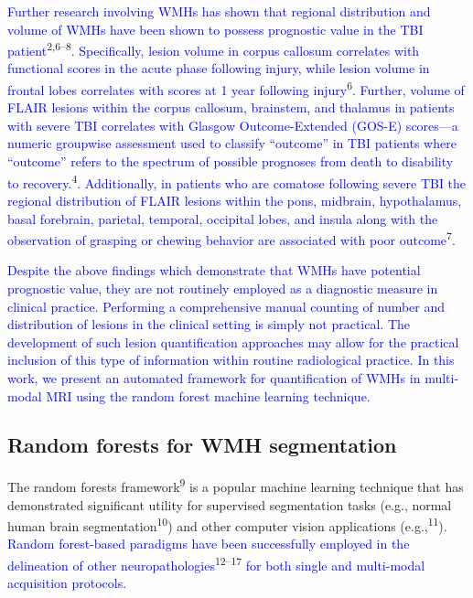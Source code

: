 \documentclass[11pt,]{article}
\begin{document}
\textcolor{blue}{Further research involving WMHs has shown that regional distribution and volume of WMHs have been shown to possess prognostic value in the TBI patient}\textsuperscript{2,6--8}\textcolor{blue}{. Specifically, lesion volume in corpus callosum correlates with functional scores in the acute phase following injury, while lesion volume in frontal lobes correlates with scores at 1 year following injury}\textsuperscript{6}\textcolor{blue}{.
Further, volume of FLAIR lesions within the corpus
callosum, brainstem, and thalamus in patients with severe TBI correlates
with Glasgow Outcome-Extended (GOS-E) scores---a numeric groupwise assessment used to
classify ``outcome'' in TBI patients where ``outcome'' refers to the
spectrum of possible prognoses from death to disability to recovery.}\textsuperscript{4}\textcolor{blue}{. Additionally,
in patients who are comatose following severe TBI
the regional distribution of FLAIR lesions within the pons, midbrain, hypothalamus, basal forebrain, parietal, temporal, occipital lobes, and insula along with the observation of grasping or chewing behavior are associated with poor outcome}\textsuperscript{7}.

\textcolor{blue}{Despite the above findings which demonstrate that WMHs have potential prognostic value, they are not routinely employed as a diagnostic measure in clinical practice.  Performing a comprehensive manual counting of number and distribution of lesions in the clinical setting is simply not practical. The development of such lesion quantification approaches may allow for the practical inclusion of this type of information within routine radiological practice.  In this work, we present an automated framework for quantification of WMHs in
multi-modal MRI using the random forest machine learning technique.}

\subsection{Random forests for WMH
segmentation}\label{random-forests-for-wmh-segmentation}

The random forests framework\textsuperscript{9} is a popular machine
learning technique that has demonstrated significant utility for
supervised segmentation tasks (e.g., normal human brain
segmentation\textsuperscript{10}) and other computer vision applications
(e.g.,\textsuperscript{11}).
\textcolor{blue}{Random forest-based paradigms have been successfully employed in the
delineation of other neuropathologies}\textsuperscript{12--17}
\textcolor{blue}{for both single and multi-modal acquisition protocols.}
\end{document}
